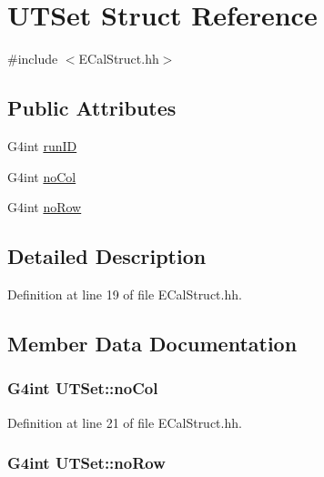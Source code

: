 \hypertarget{struct_u_t_set}{\section{U\-T\-Set Struct Reference}
\label{struct_u_t_set}
}


{\ttfamily \#include $<$E\-Cal\-Struct.\-hh$>$}

\subsection*{Public Attributes}
\begin{DoxyCompactItemize}
\item 
G4int \hyperlink{struct_u_t_set_a905fcde57b26fac021d97a9db039edff}{run\-I\-D}
\item 
G4int \hyperlink{struct_u_t_set_ad7dc1a2ba2cf95a84164728e7752c9fc}{no\-Col}
\item 
G4int \hyperlink{struct_u_t_set_a94b506d715a55a39e83f0f1cb2567747}{no\-Row}
\end{DoxyCompactItemize}


\subsection{Detailed Description}


Definition at line 19 of file E\-Cal\-Struct.\-hh.



\subsection{Member Data Documentation}
\hypertarget{struct_u_t_set_ad7dc1a2ba2cf95a84164728e7752c9fc}{
\subsubsection[{no\-Col}]{\setlength{\rightskip}{0pt plus 5cm}G4int U\-T\-Set\-::no\-Col}}\label{struct_u_t_set_ad7dc1a2ba2cf95a84164728e7752c9fc}


Definition at line 21 of file E\-Cal\-Struct.\-hh.

\hypertarget{struct_u_t_set_a94b506d715a55a39e83f0f1cb2567747}{
\subsubsection[{no\-Row}]{\setlength{\rightskip}{0pt plus 5cm}G4int U\-T\-Set\-::no\-Row}}\label{struct_u_t_set_a94b506d715a55a39e83f0f1cb2567747}


